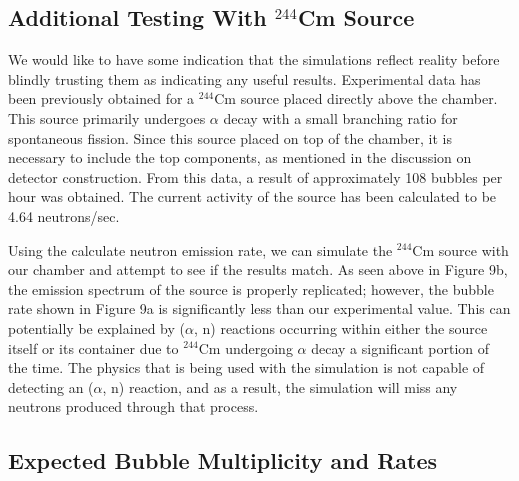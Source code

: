 \documentclass[%
12pt,
twoside,
reprint,
amsmath,amssymb,
aps,
]{article}
\begin{document}
	\subsection{Additional Testing With $^{244}$Cm Source}
	\par We would like to have some indication that the simulations reflect reality before blindly trusting them as indicating any useful results. Experimental data has been previously obtained for a $^{244}$Cm source placed directly above the chamber. This source primarily undergoes $\alpha$ decay with a small branching ratio for spontaneous fission. Since this source placed on top of the chamber, it is necessary to include the top components, as mentioned in the discussion on detector construction. From this data, a result of approximately 108 bubbles per hour was obtained. The current activity of the source has been calculated to be 4.64 neutrons/sec.
	\par Using the calculate neutron emission rate, we can simulate the $^{244}$Cm source with our chamber and attempt to see if the results match. As seen above in Figure 9b, the emission spectrum of the source is properly replicated; however, the bubble rate shown in Figure 9a is significantly less than our experimental value. This can potentially be explained by ($\alpha$, n) reactions occurring within either the source itself or its container due to $^{244}$Cm undergoing $\alpha$ decay a significant portion of the time. The physics that is being used with the simulation is not capable of detecting an ($\alpha$, n) reaction, and as a result, the simulation will miss any neutrons produced through that process.
	
	\subsection{Expected Bubble Multiplicity and Rates}
\end{document}
